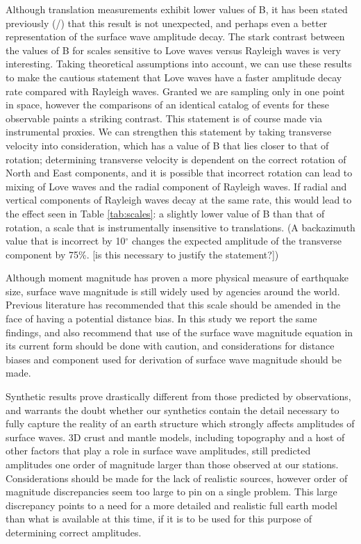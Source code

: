 \documentclass{gji}
\begin{document}
Although translation measurements exhibit lower values of B, it has been stated previously (\cite{herak1993distance}/\cite{ambraseys1997surface}) that this result is not unexpected, and perhaps even a better representation of the surface wave amplitude decay. The stark contrast between the values of B for scales sensitive to Love waves versus Rayleigh waves is very interesting. Taking theoretical assumptions into account, we can use these results to make the cautious statement that Love waves have a faster amplitude decay rate  compared with  Rayleigh waves. Granted we are sampling only in one point in space, however the comparisons of an identical catalog of events for these observable paints a striking contrast. This statement is of course made via instrumental proxies. We can strengthen this statement by taking transverse velocity into consideration, which has a value of B that lies closer to that of rotation; determining transverse velocity is dependent on the correct rotation of North and East components, and it is possible that incorrect rotation can lead to mixing of Love waves and the radial component of Rayleigh waves. If radial and vertical components of Rayleigh waves decay at the same rate, this would lead to the effect seen in Table \ref{tab:scales}: a slightly lower value of B than that of rotation, a scale that is instrumentally insensitive to translations. (A backazimuth value that is incorrect by 10$^\circ$ changes the expected amplitude of the transverse component by 75\%. [is this necessary to justify the statement?]) %

Although moment magnitude has proven a more physical measure of earthquake size, surface wave magnitude is still widely used by agencies around the world. Previous literature has recommended that this scale should be amended in the face of having a potential distance bias. In this study we report the same findings, and also recommend that use of the surface wave magnitude equation in its current form should be done with caution, and considerations for distance biases and component used for derivation of surface wave magnitude should be made.

Synthetic results prove drastically different from those predicted by observations, and warrants the doubt whether our synthetics contain the detail necessary to fully capture the reality of an earth structure which strongly affects amplitudes of surface waves. 3D crust and mantle models, including topography and a host of other factors that play a role in surface wave amplitudes, still predicted amplitudes one order of magnitude larger than those observed at our stations. Considerations should be made for the lack of realistic sources, however order of magnitude discrepancies seem too large to pin on a single problem. This large discrepancy points to a need for a more detailed and realistic full earth model than what is available at this time, if it is to be used for this purpose of determining correct amplitudes.
\end{document}
